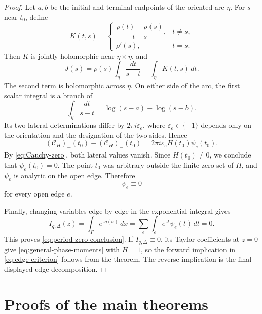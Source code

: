 \documentclass[11pt]{article}
\numberwithin{equation}{section}
\theoremstyle{definition}
\theoremstyle{remark}
\begin{document}
\begin{proof}
Let $a,b$ be the initial and terminal endpoints of the oriented arc $\eta$.
For $s$ near $t_0$, define
\[
  K(t,s)=
  \begin{cases}
    \dfrac{\rho(t)-\rho(s)}{t-s},&t\ne s,\\[2mm]
    \rho'(s),&t=s.
  \end{cases}
\]
Then $K$ is jointly holomorphic near $\eta\times\eta$, and
\begin{equation}\label{eq:local-Cauchy-splitting}
  J(s)
  =\rho(s)\int_\eta\frac{dt}{s-t}
   -\int_\eta K(t,s)\,dt.
\end{equation}
The second term is holomorphic across $\eta$.  On either side of the arc, the
first scalar integral is a branch of
\[
  \int_\eta\frac{dt}{s-t}
  =\log(s-a)-\log(s-b).
\]
Its two lateral determinations differ by
$2\pi i\varepsilon_e$, where $\varepsilon_e\in\{\pm1\}$ depends only on the
orientation and the designation of the two sides.  Hence
\begin{equation}\label{eq:local-jump}
  (\mathcal C_H)_+(t_0)-(\mathcal C_H)_-(t_0)
  =2\pi i\varepsilon_e H(t_0)\psi_e(t_0).
\end{equation}
By \eqref{eq:Cauchy-zero}, both lateral values vanish.  Since $H(t_0)\ne0$,
we conclude that $\psi_e(t_0)=0$.  The point $t_0$ was arbitrary outside the
finite zero set of $H$, and $\psi_e$ is analytic on the open edge.  Therefore
\[
  \psi_e\equiv0
\]
for every open edge $e$.

Finally, changing variables edge by edge in the exponential integral gives
\[
  I_{q,\Delta}(z)
  =\int_{\widetilde\Gamma}e^{zq(x)}\,dx
  =\sum_e\int_e e^{zt}\psi_e(t)\,dt
  =0.
\]
This proves \eqref{eq:period-zero-conclusion}.  If
$I_{q,\Delta}\equiv0$, its Taylor coefficients at $z=0$ give
\eqref{eq:general-phase-moments} with $H=1$, so the forward implication in
\eqref{eq:edge-criterion} follows from the theorem.  The reverse implication
is the final displayed edge decomposition.
\end{proof}

\section{Proofs of the main theorems}\label{sec:main-proofs}
\end{document}
